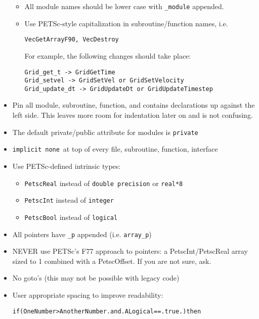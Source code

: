 \begin{itemize}
\begin{itemize}
\item All module names should be lower case with {\tt \_module} appended.

\item Use PETSc-style capitalization in subroutine/function names, i.e.
\begin{mdframed}
\begin{Verbatim}
VecGetArrayF90, VecDestroy
\end{Verbatim}
\end{mdframed}
For example, the following changes should take place:

\begin{mdframed}
\begin{Verbatim}
Grid_get_t -> GridGetTime
Grid_setvel -> GridSetVel or GridSetVelocity
Grid_update_dt -> GridUpdateDt or GridUpdateTimestep
\end{Verbatim}
\end{mdframed}

\end{itemize}

\item Pin all module, subroutine, function, and contains declarations up against the left side. 
This leaves more room for indentation later on and is not confusing.
\item The default private/public attribute for modules is {\tt private}
\item {\tt implicit none}\ at top of every file, subroutine, function, interface
\item Use PETSc-defined intrinsic types:
\begin{itemize}
\item {\tt PetscReal} instead of {\tt double precision} or {\tt real*8}
\item {\tt PetscInt} instead of {\tt integer}
\item {\tt PetscBool} instead of {\tt logical}
\end{itemize}
\item All pointers have {\tt \_p} appended (i.e. {\tt array\_p})
\item NEVER use PETSc's F77 approach to pointers: a PetscInt/PetscReal array sized to 1 combined with a PetscOffset. 
If you are not sure, ask.
\item No goto's (this may not be possible with legacy code)

\item User appropriate spacing to improve readability:

{\tt if(OneNumber>AnotherNumber.and.ALogical==.true.)then}


\end{itemize}
